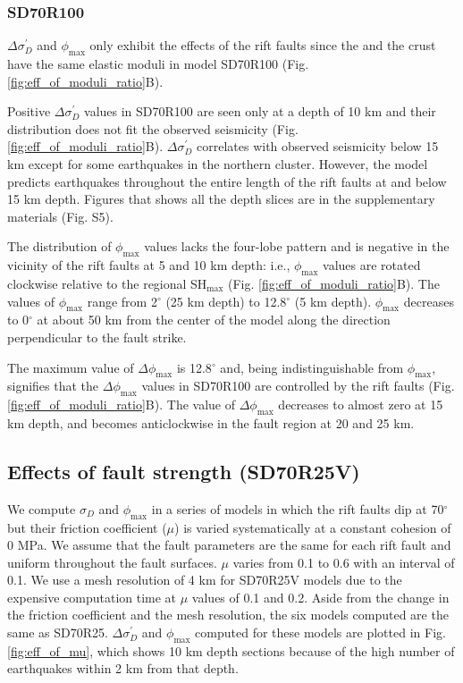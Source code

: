 \documentclass[draft]{agujournal2018}
\begin{document}
\subsubsection{SD70R100}
$\Delta\sigma_{D}^{\prime}$ and $\phi_{\max}$ only exhibit the effects of the rift faults since the  and the crust have the same elastic moduli in model SD70R100 (Fig. \ref{fig:eff_of_moduli_ratio}B).

Positive $\Delta\sigma_{D}^{\prime}$ values in SD70R100 are seen only at a depth of 10 km and their distribution does not fit the observed seismicity (Fig. \ref{fig:eff_of_moduli_ratio}B).   $\Delta\sigma_{D}^{\prime}$ correlates with observed seismicity below 15 km except for some earthquakes in the northern cluster. However, the model predicts earthquakes throughout the entire length of the rift faults at and below 15 km depth. Figures that shows all the depth slices are in the supplementary materials (Fig. S5). 

The distribution of $\phi_{\max}$ values lacks the four-lobe pattern and is negative in the vicinity of the rift faults at 5 and 10 km depth: i.e., $\phi_{\max}$ values are rotated clockwise relative to the regional SH$_{\max}$ (Fig. \ref{fig:eff_of_moduli_ratio}B). The values of $\phi_{\max}$ range from 2$^\circ$ (25 km depth) to 12.8$^\circ$ (5 km depth). $\phi_{\max}$ decreases to 0$^{\circ}$ at about 50 km from the center of the model along the direction perpendicular to the fault strike.

The maximum value of $\Delta\phi_{\max}$ is 12.8$^\circ$ and, being indistinguishable from $\phi_{\max}$, signifies that the  $\Delta\phi_{\max}$ values in SD70R100 are controlled by the rift faults (Fig. \ref{fig:eff_of_moduli_ratio}B). The value of $\Delta\phi_{\max}$ decreases to almost zero at 15 km depth, and becomes anticlockwise in the fault region at 20 and 25 km.

\subsection{Effects of fault strength (SD70R25V)}
We compute $\sigma_{D}$ and $\phi_{\max}$ in a series of models in which the rift faults dip at 70$^{\circ}$ but their friction coefficient ($\mu$) is varied systematically at a constant cohesion of 0 MPa. We assume that the fault parameters are the same for each rift fault and uniform throughout the fault surfaces. $\mu$ varies from 0.1 to 0.6 with an interval of 0.1. We use a mesh resolution of 4 km for SD70R25V models due to the expensive computation time at $\mu$ values of 0.1 and 0.2. Aside from the change in the friction coefficient and the mesh resolution, the six models computed are the same as SD70R25. $\Delta \sigma_{D}^{\prime}$ and $\phi_{\max}$ computed for these models are plotted in Fig. \ref{fig:eff_of_mu}, which shows 10 km depth sections because of the high number of earthquakes within 2 km from that depth.
\end{document}
